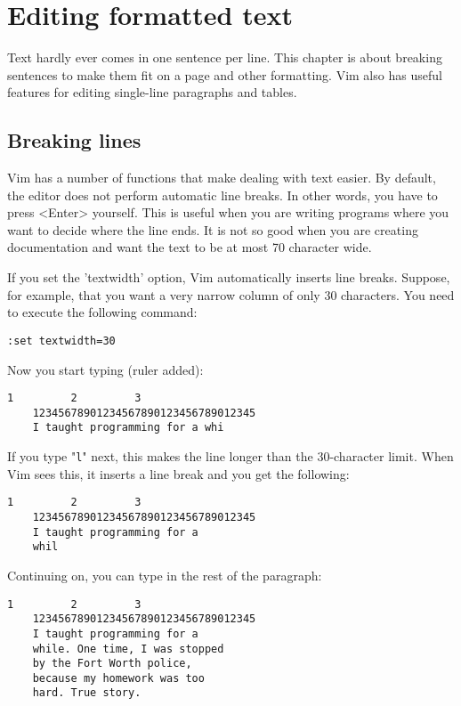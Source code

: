 		\section{Editing formatted text}
Text hardly ever comes in one sentence per line.
This chapter is about breaking sentences to make them fit on a page and other formatting.
Vim also has useful features for editing single-line paragraphs and tables.
\subsection{Breaking lines}
Vim has a number of functions that make dealing with text easier.
By default, the editor does not perform automatic line breaks.
In other words, you have to press <Enter> yourself.
This is useful when you are writing programs where you want to decide where the line ends.
It is not so good when you are creating documentation and want the text to be at most 70 character wide.

If you set the 'textwidth' option, Vim automatically inserts line breaks.
Suppose, for example, that you want a very narrow column of only 30 characters.
You need to execute the following command:

\begin{Verbatim}[samepage=true]
 :set textwidth=30
\end{Verbatim}

Now you start typing (ruler added):

\begin{Verbatim}[samepage=true]
             1         2         3
    12345678901234567890123456789012345
    I taught programming for a whi 
\end{Verbatim}

If you type "\verb!l!" next, this makes the line longer than the 30-character limit.
When Vim sees this, it inserts a line break and you get the following:

\begin{Verbatim}[samepage=true]
             1         2         3
    12345678901234567890123456789012345
    I taught programming for a 
    whil 
\end{Verbatim}

Continuing on, you can type in the rest of the paragraph:

\begin{Verbatim}[samepage=true]
             1         2         3
    12345678901234567890123456789012345
    I taught programming for a 
    while. One time, I was stopped 
    by the Fort Worth police, 
    because my homework was too 
    hard. True story. 
\end{Verbatim}

